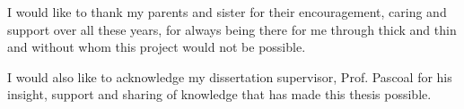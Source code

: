 
I would like to thank my parents and sister for their encouragement, caring and support over all these years, for always being there for me through thick and thin and without whom this project would not be possible.

I would also like to acknowledge my dissertation supervisor, Prof. Pascoal for his insight, support and sharing of knowledge that has made this thesis possible.



